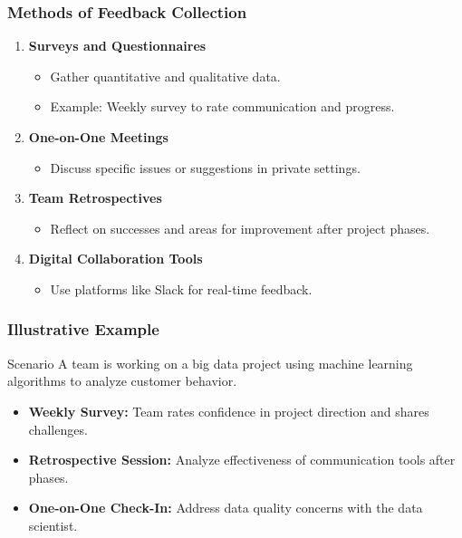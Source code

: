 \documentclass[aspectratio=169]{beamer}
\begin{document}
\begin{frame}[fragile]
    \frametitle{Methods of Feedback Collection}
    \begin{enumerate}
        \item \textbf{Surveys and Questionnaires}
        \begin{itemize}
            \item Gather quantitative and qualitative data.
            \item Example: Weekly survey to rate communication and progress.
        \end{itemize}
        \item \textbf{One-on-One Meetings}
        \begin{itemize}
            \item Discuss specific issues or suggestions in private settings.
        \end{itemize}
        \item \textbf{Team Retrospectives}
        \begin{itemize}
            \item Reflect on successes and areas for improvement after project phases.
        \end{itemize}
        \item \textbf{Digital Collaboration Tools}
        \begin{itemize}
            \item Use platforms like Slack for real-time feedback.
        \end{itemize}
    \end{enumerate}
\end{frame}

\begin{frame}[fragile]
    \frametitle{Illustrative Example}
    \begin{block}{Scenario}
        A team is working on a big data project using machine learning algorithms to analyze customer behavior.
    \end{block}
    \begin{itemize}
        \item \textbf{Weekly Survey:} Team rates confidence in project direction and shares challenges.
        \item \textbf{Retrospective Session:} Analyze effectiveness of communication tools after phases.
        \item \textbf{One-on-One Check-In:} Address data quality concerns with the data scientist.
    \end{itemize}
\end{frame}
\end{document}
